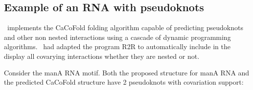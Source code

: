 \subsection{Example of an RNA with pseudoknots}

\rscape\ implements the CaCoFold folding algorithm capable of
predicting pseudoknots and other non nested interactions using a
cascade of dynamic programming algorithms.  \rscape\ had adapted the
program R2R to automatically include in the display all covarying
interactions whether they are nested or not.

Consider the manA RNA motif. Both the proposed structure for manA RNA
and the predicted CaCoFold structure have 2 pseudoknots with
covariation support:

\\

